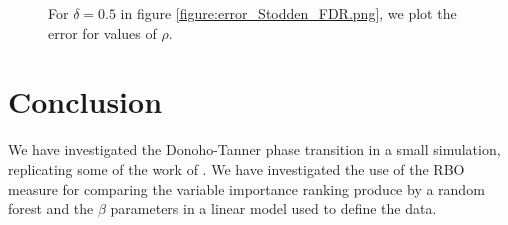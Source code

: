 \documentclass[11pt]{article}
\begin{document}
\begin{figure}[ht]
\begin{minipage}[t]{0.5\linewidth}
    \caption{For $\delta=0.5$ in figure \ref{figure:error_Stodden_FDR.png}, we plot the error for values of $\rho.$} 
 \label{figure:transect.png}
    \vspace{4ex}
  \end{minipage}
\end{figure}
 


















\section{Conclusion}
We have investigated the Donoho-Tanner phase transition in a small simulation, replicating some of the work of
\cite{Donoho.and.Stodden.2006}. We have investigated the use of the RBO measure for comparing the variable importance
ranking produce by a random forest and the $\beta$ parameters in a linear model used to define the data.




\end{document}
